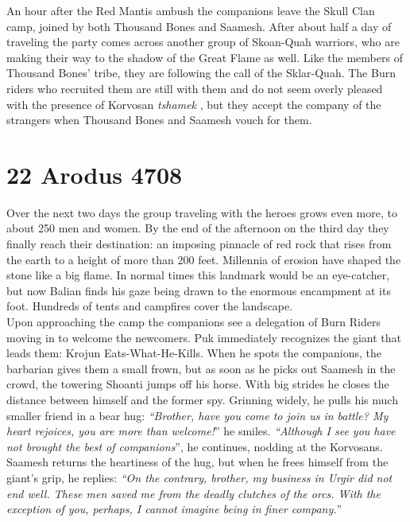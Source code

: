 An hour after the Red Mantis ambush the companions leave the Skull Clan camp, joined by both Thousand Bones and Saamesh. After about half a day of traveling the party comes across another group of Skoan-Quah warriors, who are making their way to the shadow of the Great Flame as well. Like the members of Thousand Bones' tribe, they are following the call of the Sklar-Quah. The Burn riders who recruited them are still with them and do not seem overly pleased with the presence of Korvosan {\itshape tshamek} , but they accept the company of the strangers when Thousand Bones and Saamesh vouch for them. \section{22 Arodus 4708}

Over the next two days the group traveling with the heroes grows even more, to about 250 men and women. By the end of the afternoon on the third day they finally reach their destination: an imposing pinnacle of red rock that rises from the earth to a height of more than 200 feet. Millennia of erosion have shaped the stone like a big flame. In normal times this landmark would be an eye-catcher, but now Balian finds his gaze being drawn to the enormous encampment at its foot. Hundreds of tents and campfires cover the landscape.\\

Upon approaching the camp the companions see a delegation of Burn Riders moving in to welcome the newcomers. Puk immediately recognizes the giant that leads them: Krojun Eats-What-He-Kills. When he spots the companions, the barbarian gives them a small frown, but as soon as he picks out Saamesh in the crowd, the towering Shoanti jumps off his horse. With big strides he closes the distance between himself and the former spy. Grinning widely, he pulls his much smaller friend in a bear hug: {\itshape``Brother, have you come to join us in battle? My heart rejoices, you are more than welcome!}'' he smiles. {\itshape``Although I see you have not brought the best of companions}'', he continues, nodding at the Korvosans.\\

Saamesh returns the heartiness of the hug, but when he frees himself from the giant's grip, he replies: {\itshape``On the contrary, brother, my business in Urgir did not end well. These men saved me from the deadly clutches of the orcs. With the exception of you, perhaps, I cannot imagine being in finer company.}''\\

